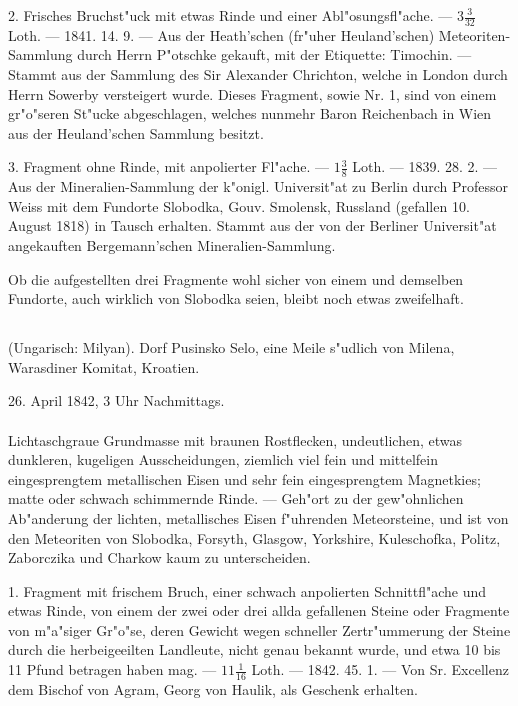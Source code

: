 \documentclass[a4paper, 11pt, oneside, polutonikogreek, german]{article}
\begin{document}
2. Frisches Bruchst"uck mit etwas Rinde und einer Abl"osungsfl"ache. --- $3\frac{3}{32}$ Loth. --- 1841. 14. 9. --- Aus der Heath'schen (fr"uher Heuland'schen) Meteoriten-Sammlung durch Herrn P"otschke gekauft, mit der Etiquette: Timochin. --- Stammt aus der Sammlung des Sir Alexander Chrichton, welche in London durch Herrn Sowerby versteigert wurde. Dieses Fragment, sowie Nr. 1, sind von einem gr"o"seren St"ucke abgeschlagen, welches nunmehr Baron Reichenbach in Wien aus der Heuland'schen Sammlung besitzt.

3. Fragment ohne Rinde, mit anpolierter Fl"ache. --- $1\frac{3}{8}$ Loth. --- 1839. 28. 2. --- Aus der Mineralien-Sammlung der k"onigl. Universit"at zu Berlin durch Professor Weiss mit dem Fundorte Slobodka‚ Gouv. Smolensk, Russland (gefallen 10. August 1818) in Tausch erhalten. Stammt aus der von der Berliner Universit"at angekauften Bergemann’schen Mineralien-Sammlung.

\setlength{\leftskip}{10mm}
\setlength{\parindent}{0pt}

{\footnotesize Ob die aufgestellten drei Fragmente wohl sicher von einem und demselben Fundorte, auch wirklich von Slobodka seien, bleibt noch etwas zweifelhaft.}

\setlength{\leftskip}{0pt}
\setlength{\parindent}{20pt}

\subsection{}
\begin{center}

(Ungarisch: Milyan). Dorf Pusinsko Selo, eine Meile s"udlich von Milena, Warasdiner Komitat, Kroatien.

26. April 1842, 3 Uhr Nachmittags.
\end{center}
\paragraph{}
Lichtaschgraue Grundmasse mit braunen Rostflecken, undeutlichen, etwas dunkleren, kugeligen Ausscheidungen, ziemlich viel fein und mittelfein eingesprengtem metallischen Eisen und sehr fein eingesprengtem Magnetkies; matte oder schwach schimmernde Rinde. --- Geh"ort zu der gew"ohnlichen Ab"anderung der lichten, metallisches Eisen f"uhrenden Meteorsteine, und ist von den Meteoriten von Slobodka, Forsyth, Glasgow, Yorkshire, Kuleschofka, Politz, Zaborczika und Charkow kaum zu unterscheiden.

1. Fragment mit frischem Bruch, einer schwach anpolierten Schnittfl"ache und etwas Rinde, von einem der zwei oder drei allda gefallenen Steine oder Fragmente von m"a"siger Gr"o"se, deren Gewicht wegen schneller Zertr"ummerung der Steine durch die herbeigeeilten Landleute, nicht genau bekannt wurde, und etwa 10 bis 11 Pfund betragen haben mag. --- $11\frac{1}{16}$ Loth. --- 1842. 45. 1. --- Von Sr. Excellenz dem Bischof von Agram, Georg von Haulik, als Geschenk erhalten.
\end{document}

